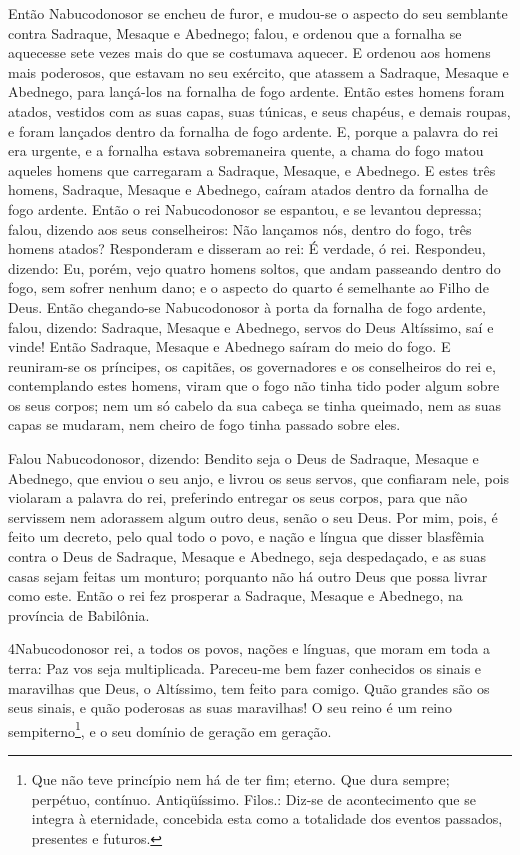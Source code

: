 Então Nabucodonosor se encheu de furor, e mudou-se o aspecto do
seu semblante contra Sadraque, Mesaque e Abednego; falou, e ordenou
que a fornalha se aquecesse sete vezes mais do que se costumava
aquecer. E ordenou aos homens mais poderosos, que estavam no
seu exército, que atassem a Sadraque, Mesaque e Abednego, para
lançá-los na fornalha de fogo ardente. Então estes homens
foram atados, vestidos com as suas capas, suas túnicas, e seus
chapéus, e demais roupas, e foram lançados dentro da fornalha de
fogo ardente. E, porque a palavra do rei era urgente, e a
fornalha estava sobremaneira quente, a chama do fogo matou aqueles
homens que carregaram a Sadraque, Mesaque, e Abednego. E
estes três homens, Sadraque, Mesaque e Abednego, caíram atados
dentro da fornalha de fogo ardente. Então o rei Nabucodonosor
se espantou, e se levantou depressa; falou, dizendo aos seus
conselheiros: Não lançamos nós, dentro do fogo, três homens atados?
Responderam e disseram ao rei: É verdade, ó rei. Respondeu,
dizendo: Eu, porém, vejo quatro homens soltos, que andam passeando
dentro do fogo, sem sofrer nenhum dano; e o aspecto do quarto é
semelhante ao Filho de Deus. Então chegando-se Nabucodonosor
à porta da fornalha de fogo ardente, falou, dizendo: Sadraque,
Mesaque e Abednego, servos do Deus Altíssimo, saí e vinde! Então
Sadraque, Mesaque e Abednego saíram do meio do fogo. E
reuniram-se os príncipes, os capitães, os governadores e os
conselheiros do rei e, contemplando estes homens, viram que o fogo
não tinha tido poder algum sobre os seus corpos; nem um só cabelo da
sua cabeça se tinha queimado, nem as suas capas se mudaram, nem
cheiro de fogo tinha passado sobre eles.

Falou Nabucodonosor, dizendo: Bendito seja o Deus de Sadraque,
Mesaque e Abednego, que enviou o seu anjo, e livrou os seus servos,
que confiaram nele, pois violaram a palavra do rei, preferindo
entregar os seus corpos, para que não servissem nem adorassem algum
outro deus, senão o seu Deus. Por mim, pois, é feito um
decreto, pelo qual todo o povo, e nação e língua que disser
blasfêmia contra o Deus de Sadraque, Mesaque e Abednego, seja
despedaçado, e as suas casas sejam feitas um monturo; porquanto não
há outro Deus que possa livrar como este. Então o rei fez
prosperar a Sadraque, Mesaque e Abednego, na província de Babilônia.

\medskip

\lettrine{4} Nabucodonosor rei, a todos os povos, nações e
línguas, que moram em toda a terra: Paz vos seja multiplicada.
Pareceu-me bem fazer conhecidos os sinais e maravilhas que Deus,
o Altíssimo, tem feito para comigo. Quão grandes são os seus
sinais, e quão poderosas as suas maravilhas! O seu reino é um reino
sempiterno\footnote{Que não teve princípio nem há de ter fim;
eterno. Que dura sempre; perpétuo, contínuo. Antiqüíssimo. Filos.:
Diz-se de acontecimento que se integra à eternidade, concebida esta
como a totalidade dos eventos passados, presentes e futuros.}, e o
seu domínio de geração em geração.


